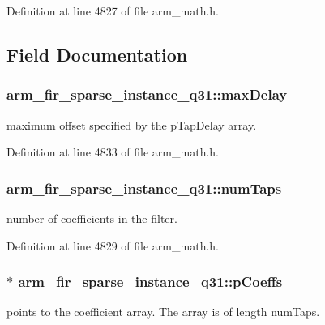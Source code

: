 Definition at line 4827 of file arm\-\_\-math.\-h.



\subsection{Field Documentation}
\hypertarget{structarm__fir__sparse__instance__q31_afdd3a1dc72132c854dc379154b68b674}{
\subsubsection[{max\-Delay}]{ arm\-\_\-fir\-\_\-sparse\-\_\-instance\-\_\-q31\-::max\-Delay}}\label{structarm__fir__sparse__instance__q31_afdd3a1dc72132c854dc379154b68b674}
maximum offset specified by the p\-Tap\-Delay array. 

Definition at line 4833 of file arm\-\_\-math.\-h.

\hypertarget{structarm__fir__sparse__instance__q31_a07b6c01e58ec6dde384719130d36b0dc}{
\subsubsection[{num\-Taps}]{ arm\-\_\-fir\-\_\-sparse\-\_\-instance\-\_\-q31\-::num\-Taps}}\label{structarm__fir__sparse__instance__q31_a07b6c01e58ec6dde384719130d36b0dc}
number of coefficients in the filter. 

Definition at line 4829 of file arm\-\_\-math.\-h.

\hypertarget{structarm__fir__sparse__instance__q31_a093d6227f0d1597982cd083fb126f4e0}{
\subsubsection[{p\-Coeffs}]{$\ast$ arm\-\_\-fir\-\_\-sparse\-\_\-instance\-\_\-q31\-::p\-Coeffs}}\label{structarm__fir__sparse__instance__q31_a093d6227f0d1597982cd083fb126f4e0}
points to the coefficient array. The array is of length num\-Taps. 

